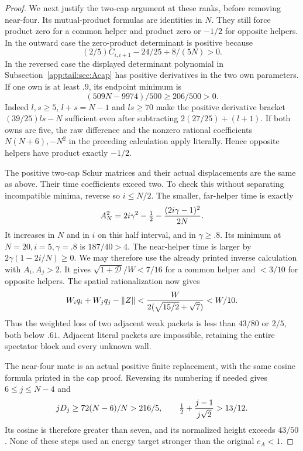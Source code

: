 \documentclass[11pt]{article}
\theoremstyle{definition}
\theoremstyle{remark}
\newcommand{\norm}[1]{\lVert #1\rVert}
\begin{document}
\begin{proof}
We next justify the two-cap argument at these ranks, before removing
near-four. Its mutual-product formulas are identities in $N$.
They still force product zero for a common helper and product zero
or $-1/2$ for opposite helpers. In the outward case the zero-product
determinant is positive because
\[
 (2/5)C_{i,i+1}-24/25+8/(5N)>0.
\]
In the reversed case the displayed determinant polynomial in
Subsection~\ref{app:tail:sec:Acap} has positive derivatives in the
two own parameters. If one own is at least $.9$, its endpoint
minimum is
\[
 (509N-9974)/500\ge206/500>0.
\]
Indeed $l,s\ge5$, $l+s=N-1$ and $ls\ge70$ make the positive
derivative bracket $(39/25)ls-N$ sufficient even after subtracting
$2(27/25)+(l+1)$. If both owns are five, the raw difference
and the nonzero rational coefficients $N(N+6),-N^2$ in the
preceding calculation apply literally. Hence opposite helpers have
product exactly $-1/2$.

The positive two-cap Schur matrices and their actual displacements
are the same as above. Their time coefficients exceed two. To check
this without separating incompatible minima, reverse so $i\le N/2$.
The smaller, far-helper time is exactly
\[
 A_N^2=2i\gamma^2-\tfrac12-
                     {(2i\gamma-1)^2\over2N}.
\]
It increases in $N$ and in $i$ on this half interval, and in
$\gamma\ge.8$. Its minimum at $N=20,i=5,\gamma=.8$ is
$187/40>4$. The near-helper time is larger by
$2\gamma(1-2i/N)\ge0$. We may therefore use the already
printed inverse calculation with $A_i,A_j>2$.
It gives $\sqrt{1+\mathcal D}/W<7/16$ for a common helper
and $<3/10$ for opposite helpers. The spatial rationalization
now gives
\[
 W_iq_i+W_jq_j-\norm Z
 <{W\over2(\sqrt{15/2}+\sqrt7)}<W/10.
\]
Thus the weighted loss of two adjacent weak packets is less than
$43/80$ or $2/5$, both below $.61$. Adjacent literal packets
are impossible, retaining the entire spectator block and every
unknown wall.

The near-four mate is an actual positive finite replacement, with
the same cosine formula printed in the cap proof. Reversing its
numbering if needed gives $6\le j\le N-4$ and
\[
 jD_j\ge72(N-6)/N>216/5,\qquad
 \tfrac12+{j-1\over j\sqrt2}>13/12.
\]
Its cosine is therefore greater than seven, and its normalized
height exceeds $43/50$. None of these steps used an energy target
stronger than the original $e_A<1$.
\end{proof}
\end{document}
